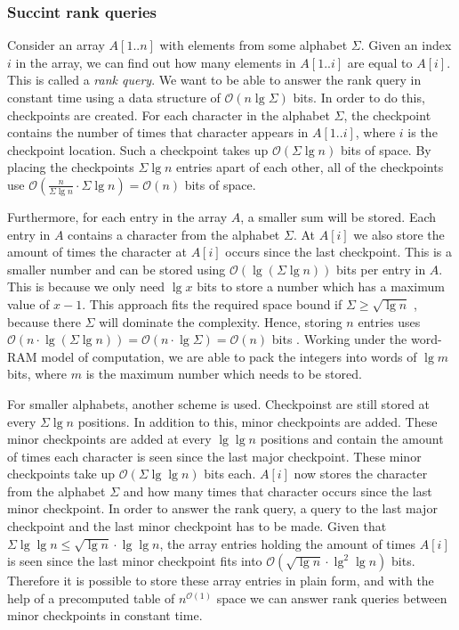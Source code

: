 \subsubsection{Succint rank queries}
\label{sssect:succintrank}
Consider an array $A[1..n]$ with elements from some alphabet $\Sigma$. Given an index $i$ in the array, we can find out how many elements in $A[1..i]$ are equal to $A[i]$. This is called a \emph{rank query}. We want to be able to answer the rank query in constant time using a data structure of $\mathcal{O}(n \lg \Sigma)$ bits. In order to do this, checkpoints are created. For each character in the alphabet $\Sigma$, the checkpoint contains the number of times that character appears in $A[1..i]$, where $i$ is the checkpoint location. Such a checkpoint takes up $\mathcal{O}(\Sigma \lg n)$ bits of space. By placing the checkpoints $\Sigma \lg n$ entries apart of each other, all of the checkpoints use $\mathcal{O}(\frac{n}{\Sigma \lg n} \cdot \Sigma \lg n) = \mathcal{O}(n)$ bits of space.

Furthermore, for each entry in the array $A$, a smaller sum will be stored. Each entry in $A$ contains a character from the alphabet $\Sigma$. At $A[i]$ we also store the amount of times the character at $A[i]$ occurs since the last checkpoint. This is a smaller number and can be stored using $\mathcal{O}(\lg (\Sigma \lg n))$ bits per entry in $A$. This is because we only need $\lg x$ bits to store a number which has a maximum value of $x-1$. This approach fits the required space bound if $\Sigma \geq \sqrt{\lg n}$ , because there $\Sigma$ will dominate the complexity. Hence, storing $n$ entries uses $\mathcal{O}(n\cdot\lg(\Sigma \lg n)) = \mathcal{O}(n\cdot\lg\Sigma) =  \mathcal{O}(n)$ bits . Working under the word-RAM model of computation, we are able to pack the integers into words of $\lg m$ bits, where $m$ is the maximum number which needs to be stored.

For smaller alphabets, another scheme is used. Checkpoinst are still stored at every $\Sigma \lg n$ positions. In addition to this, minor checkpoints are added. These minor checkpoints are added at every $\lg \lg n$ positions and contain the amount of times each character is seen since the last major checkpoint. These minor checkpoints take up $\mathcal{O}(\Sigma \lg \lg n)$ bits each. $A[i]$ now stores the character from the alphabet $\Sigma$ and how many times that character occurs since the last minor checkpoint. In order to answer the rank query, a query to the last major checkpoint and the last minor checkpoint has to be made. Given that $\Sigma \lg \lg n \leq \sqrt{\lg n} \cdot \lg \lg n$, the array entries holding the amount of times $A[i]$ is seen since the last minor checkpoint fits into $\mathcal{O}(\sqrt{\lg n} \cdot \lg^2 \lg n)$ bits. Therefore it is possible to store these array entries in plain form, and with the help of a precomputed table of $n^{\mathcal{O}(1)}$ space we can answer rank queries between minor checkpoints in constant time.   

